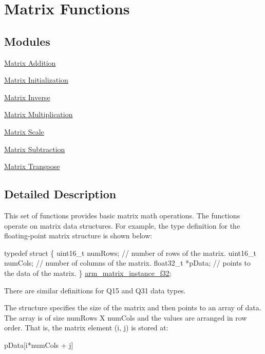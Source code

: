 \hypertarget{group__group_matrix}{\section{Matrix Functions}
\label{group__group_matrix}
}
\subsection*{Modules}
\begin{DoxyCompactItemize}
\item 
\hyperlink{group___matrix_add}{Matrix Addition}
\item 
\hyperlink{group___matrix_init}{Matrix Initialization}
\item 
\hyperlink{group___matrix_inv}{Matrix Inverse}
\item 
\hyperlink{group___matrix_mult}{Matrix Multiplication}
\item 
\hyperlink{group___matrix_scale}{Matrix Scale}
\item 
\hyperlink{group___matrix_sub}{Matrix Subtraction}
\item 
\hyperlink{group___matrix_trans}{Matrix Transpose}
\end{DoxyCompactItemize}


\subsection{Detailed Description}
This set of functions provides basic matrix math operations. The functions operate on matrix data structures. For example, the type definition for the floating-\/point matrix structure is shown below\-: 
\begin{DoxyPre}
    typedef struct
    \{
      uint16\_t numRows;     // number of rows of the matrix.
      uint16\_t numCols;     // number of columns of the matrix.
      float32\_t *pData;     // points to the data of the matrix.
    \} \hyperlink{structarm__matrix__instance__f32}{arm\_matrix\_instance\_f32};
\end{DoxyPre}
 There are similar definitions for Q15 and Q31 data types.

The structure specifies the size of the matrix and then points to an array of data. The array is of size {\ttfamily num\-Rows X num\-Cols} and the values are arranged in row order. That is, the matrix element (i, j) is stored at\-: 
\begin{DoxyPre}
    pData[i*numCols + j]
\end{DoxyPre}


